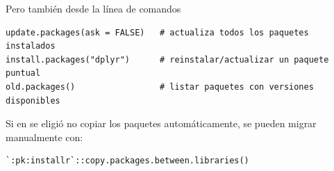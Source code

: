 \documentclass[8pt]{beamer}
\begin{document}
\begin{frame}[fragile]
	Pero tambi\'en desde la l\'inea de comandos
	
\begin{lstlisting}[style=RScript]
update.packages(ask = FALSE)   # actualiza todos los paquetes instalados
install.packages("dplyr")      # reinstalar/actualizar un paquete puntual
old.packages()                 # listar paquetes con versiones disponibles
\end{lstlisting}

\begin{exampleblock}{}
Si en  se eligió no copiar los paquetes automáticamente, se pueden migrar manualmente con:
\begin{lstlisting}[style=RScript]
	`:pk:installr`::copy.packages.between.libraries()
\end{lstlisting}
\end{exampleblock}
\end{frame}
\end{document}
